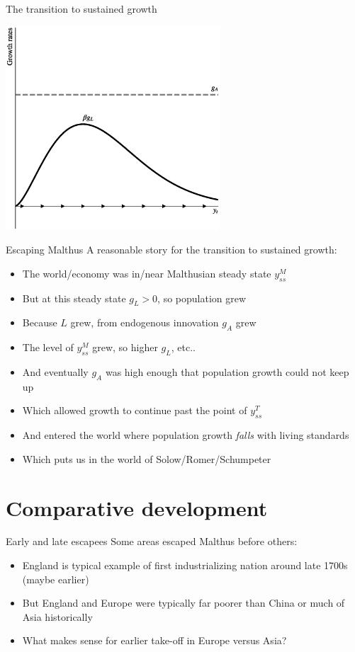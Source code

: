 \begin{frame}{The transition to sustained growth}
\begin{center}
\includegraphics[height=3in]{../Figures/fig-ch9-fig5.eps}
\end{center}
\end{frame}

\begin{frame}{Escaping Malthus}
A reasonable story for the transition to sustained growth:
\begin{itemize}
	\item The world/economy was in/near Malthusian steady state $y_{ss}^M$
	\item But at this steady state $g_L > 0$, so population grew
	\item Because $L$ grew, from endogenous innovation $g_A$ grew
	\item The level of $y_{ss}^M$ grew, so higher $g_L$, etc..
	\item And eventually $g_A$ was high enough that population growth could not keep up
	\item Which allowed growth to continue past the point of $y_{ss}^T$
	\item And entered the world where population growth \textit{falls} with living standards
	\item Which puts us in the world of Solow/Romer/Schumpeter
\end{itemize}
\end{frame}

\section{Comparative development}
\begin{frame}{Early and late escapees}
Some areas escaped Malthus before others:
\begin{itemize}
	\item England is typical example of first industrializing nation around late 1700s (maybe earlier)
	\item But England and Europe were typically far poorer than China or much of Asia historically
	\item What makes sense for earlier take-off in Europe versus Asia?
\end{itemize}
\end{frame}

